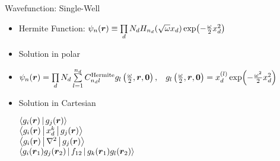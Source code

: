 \documentclass[10pt, t]{beamer}
\begin{document}
\begin{frame}[fragile]{Wavefunction: Single-Well}
    \begin{itemize}[<+->]
        \item Hermite Function: $\psi_n(\boldsymbol{{r}}) \equiv \prod\limits_d N_d
            H_{n_d}(\sqrt{\omega}x_d)\exp(-\frac{\omega}{2}x^2_d)$
        \item Solution in polar
        \item $\psi_n(\boldsymbol{{r}}) = \prod\limits_d N_d \sum\limits^{n_d}_{l=1}
            C^{\text{Hermite}}_{n_dl}
            g_l\left(\frac{\omega}{2},\boldsymbol{{r}},\boldsymbol{{0}}\right),\hspace{0.3cm} g_l\left(\frac{\omega}{2},\boldsymbol{{r}},\boldsymbol{{0}}\right) = x_d^{(l)}\exp(-\frac{\omega^2}{2}x^2_d)$
        \item Solution in Cartesian \\ \vspace{0.2cm} \hspace{1cm}
            \begin{minipage}[H]{0.5\textwidth}
                $\Braket{g_i(\boldsymbol{{r}})|g_j(\boldsymbol{{r}})}$ \vsp \\
                $\Braket{g_i(\boldsymbol{{r}})|x^k_d|g_j(\boldsymbol{{r}})}$ \vsp \\
                $\Braket{g_i(\boldsymbol{{r}})|\nabla^2|g_j(\boldsymbol{{r}})}$ \vsp \\
                $\Braket{g_i(\boldsymbol{{r}}_1)g_j(\boldsymbol{{r}}_2)|f_{12}|g_k(\boldsymbol{{r}}_1)g_l(\boldsymbol{{r}}_2)}$ \\
            \end{minipage}
    \end{itemize}
\end{frame}
\end{document}
